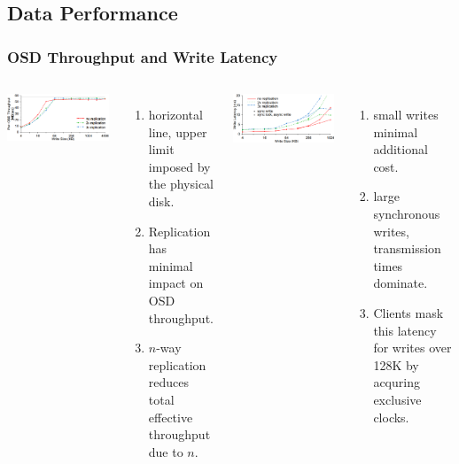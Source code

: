 \documentclass[cjk,slidestop,mathserif]{beamer}
\begin{document}
\begin{CJK}{UTF8}{gkai}
\subsection{Data Performance}
\begin{frame}
 \frametitle{OSD Throughput and Write Latency}
 \begin{columns}[c]
  \includegraphics[width=\columnwidth]{p5.png} \\
  \begin{enumerate}
   \item horizontal line, upper limit imposed by the physical disk.
   \item Replication has minimal impact on OSD throughput.
   \item $n$-way replication reduces total effective throughput due to $n$.
  \end{enumerate}

  \includegraphics[width=\columnwidth]{p7.png} \\
  \begin{enumerate}
   \item small writes minimal additional cost.
   \item large synchronous writes, transmission times dominate.
   \item Clients mask this latency for writes over 128K by acquring exclusive clocks.
  \end{enumerate}
 \end{columns}
\end{frame}


\end{CJK}
\end{document}
